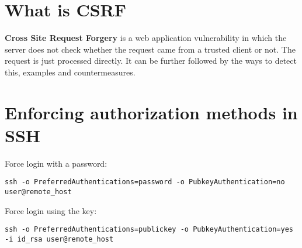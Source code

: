 \section{What is CSRF}

\textbf{Cross Site Request Forgery} is a web application vulnerability in which the server does not check whether the request came from a trusted client or not. The request is just processed directly. It can be further followed by the ways to detect this, examples and countermeasures.

\section{Enforcing authorization methods in SSH}

Force login with a password:

\noindent
\texttt{ssh -o PreferredAuthentications=password -o PubkeyAuthentication=no user@remote\_host}

Force login using the key:

\noindent
\texttt{ssh -o PreferredAuthentications=publickey -o PubkeyAuthentication=yes -i id\_rsa user@remote\_host}